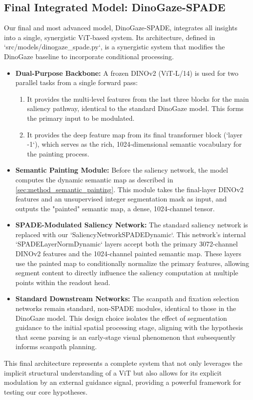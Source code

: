 \subsection{Final Integrated Model: DinoGaze-SPADE}
Our final and most advanced model, DinoGaze-SPADE, integrates all insights into a single, synergistic ViT-based system. Its architecture, defined in `src/models/dinogaze\_spade.py`, is a synergistic system that modifies the DinoGaze baseline to incorporate conditional processing.

\begin{itemize}
    \item \textbf{Dual-Purpose Backbone:} A frozen DINOv2 (ViT-L/14) is used for two parallel tasks from a single forward pass:
    \begin{enumerate}
        \item It provides the multi-level features from the last three blocks for the main saliency pathway, identical to the standard DinoGaze model. This forms the primary input to be modulated.
        \item It provides the deep feature map from its final transformer block (`layer -1`), which serves as the rich, 1024-dimensional semantic vocabulary for the painting process.
    \end{enumerate}
    \item \textbf{Semantic Painting Module:} Before the saliency network, the model computes the dynamic semantic map as described in \cref{sec:method_semantic_painting}. This module takes the final-layer DINOv2 features and an unsupervised integer segmentation mask as input, and outputs the "painted" semantic map, a dense, 1024-channel tensor.
    \item \textbf{SPADE-Modulated Saliency Network:} The standard saliency network is replaced with our `SaliencyNetworkSPADEDynamic`. This network's internal `SPADELayerNormDynamic` layers accept both the primary 3072-channel DINOv2 features and the 1024-channel painted semantic map. These layers use the painted map to conditionally normalize the primary features, allowing segment content to directly influence the saliency computation at multiple points within the readout head.
    \item \textbf{Standard Downstream Networks:} The scanpath and fixation selection networks remain standard, non-SPADE modules, identical to those in the DinoGaze model. This design choice isolates the effect of segmentation guidance to the initial spatial processing stage, aligning with the hypothesis that scene parsing is an early-stage visual phenomenon that subsequently informs scanpath planning.
\end{itemize}
This final architecture represents a complete system that not only leverages the implicit structural understanding of a ViT but also allows for its explicit modulation by an external guidance signal, providing a powerful framework for testing our core hypotheses.


